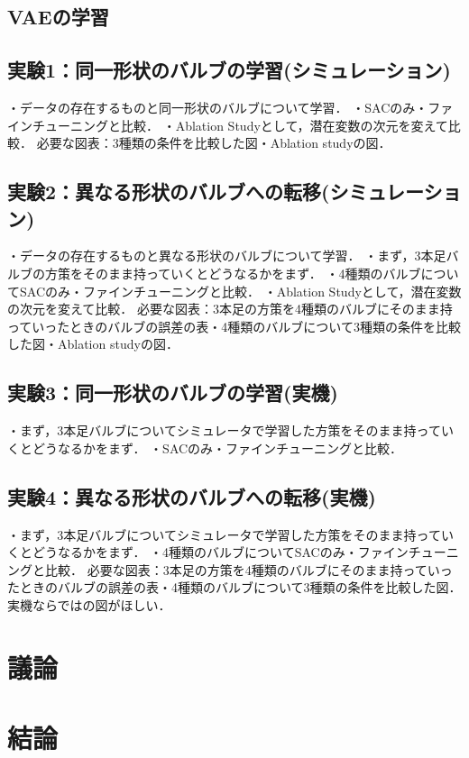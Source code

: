 \documentclass[dvipdfmx]{ampbt_nomag}
\begin{document}
\subsection{VAEの学習}


\subsection{実験1：同一形状のバルブの学習(シミュレーション)}
・データの存在するものと同一形状のバルブについて学習．
・SACのみ・ファインチューニングと比較．
・Ablation Studyとして，潜在変数の次元を変えて比較．
必要な図表：3種類の条件を比較した図・Ablation studyの図．

\subsection{実験2：異なる形状のバルブへの転移(シミュレーション)}
・データの存在するものと異なる形状のバルブについて学習．
・まず，3本足バルブの方策をそのまま持っていくとどうなるかをまず．
・4種類のバルブについてSACのみ・ファインチューニングと比較．
・Ablation Studyとして，潜在変数の次元を変えて比較．
必要な図表：3本足の方策を4種類のバルブにそのまま持っていったときのバルブの誤差の表・4種類のバルブについて3種類の条件を比較した図・Ablation studyの図．

\subsection{実験3：同一形状のバルブの学習(実機)}
・まず，3本足バルブについてシミュレータで学習した方策をそのまま持っていくとどうなるかをまず．
・SACのみ・ファインチューニングと比較．

\subsection{実験4：異なる形状のバルブへの転移(実機)}
・まず，3本足バルブについてシミュレータで学習した方策をそのまま持っていくとどうなるかをまず．
・4種類のバルブについてSACのみ・ファインチューニングと比較．
必要な図表：3本足の方策を4種類のバルブにそのまま持っていったときのバルブの誤差の表・4種類のバルブについて3種類の条件を比較した図．
実機ならではの図がほしい．



\section{議論}\label{sec-discussion}

\section{結論}\label{sec-conclusion}
\end{document}
